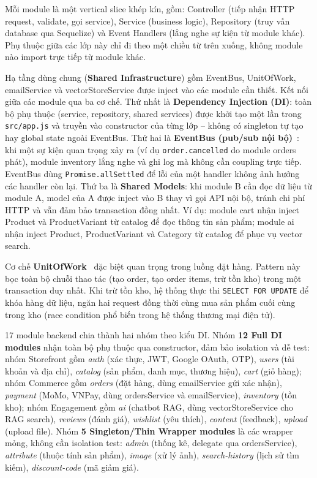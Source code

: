 Mỗi module là một vertical slice khép kín, gồm: Controller (tiếp nhận HTTP request, validate, gọi service), Service (business logic), Repository (truy vấn database qua Sequelize) và Event Handlers (lắng nghe sự kiện từ module khác). Phụ thuộc giữa các lớp này chỉ đi theo một chiều từ trên xuống, không module nào import trực tiếp từ module khác.

Hạ tầng dùng chung (\textbf{Shared Infrastructure}) gồm EventBus, UnitOfWork, emailService và vectorStoreService được inject vào các module cần thiết. Kết nối giữa các module qua ba cơ chế. Thứ nhất là \textbf{Dependency Injection (DI)}: toàn bộ phụ thuộc (service, repository, shared services) được khởi tạo một lần trong \texttt{src/app.js} và truyền vào constructor của từng lớp -- không có singleton tự tạo hay global state ngoài EventBus. Thứ hai là \textbf{EventBus (pub/sub nội bộ)}~\cite{hohpe2004enterprise}: khi một sự kiện quan trọng xảy ra (ví dụ \texttt{order.cancelled} do module orders phát), module inventory lắng nghe và ghi log mà không cần coupling trực tiếp. EventBus dùng \texttt{Promise.allSettled} để lỗi của một handler không ảnh hưởng các handler còn lại. Thứ ba là \textbf{Shared Models}: khi module B cần đọc dữ liệu từ module A, model của A được inject vào B thay vì gọi API nội bộ, tránh chi phí HTTP và vẫn đảm bảo transaction đồng nhất. Ví dụ: module cart nhận inject Product và ProductVariant từ catalog để đọc thông tin sản phẩm; module ai nhận inject Product, ProductVariant và Category từ catalog để phục vụ vector search.

Cơ chế \textbf{UnitOfWork}~\cite{fowler2003patterns} đặc biệt quan trọng trong luồng đặt hàng. Pattern này bọc toàn bộ chuỗi thao tác (tạo order, tạo order items, trừ tồn kho) trong một transaction duy nhất. Khi trừ tồn kho, hệ thống thực thi \texttt{SELECT FOR UPDATE} để khóa hàng dữ liệu, ngăn hai request đồng thời cùng mua sản phẩm cuối cùng trong kho (race condition phổ biến trong hệ thống thương mại điện tử).

17 module backend chia thành hai nhóm theo kiểu DI. Nhóm \textbf{12 Full DI modules} nhận toàn bộ phụ thuộc qua constructor, đảm bảo isolation và dễ test: nhóm Storefront gồm \textit{auth} (xác thực, JWT, Google OAuth, OTP), \textit{users} (tài khoản và địa chỉ), \textit{catalog} (sản phẩm, danh mục, thương hiệu), \textit{cart} (giỏ hàng); nhóm Commerce gồm \textit{orders} (đặt hàng, dùng emailService gửi xác nhận), \textit{payment} (MoMo, VNPay, dùng ordersService và emailService), \textit{inventory} (tồn kho); nhóm Engagement gồm \textit{ai} (chatbot RAG, dùng vectorStoreService cho RAG search), \textit{reviews} (đánh giá), \textit{wishlist} (yêu thích), \textit{content} (feedback), \textit{upload} (upload file). Nhóm \textbf{5 Singleton\slash Thin Wrapper modules} là các wrapper mỏng, không cần isolation test: \textit{admin} (thống kê, delegate qua ordersService), \textit{attribute} (thuộc tính sản phẩm), \textit{image} (xử lý ảnh), \textit{search-history} (lịch sử tìm kiếm), \textit{discount-code} (mã giảm giá).

